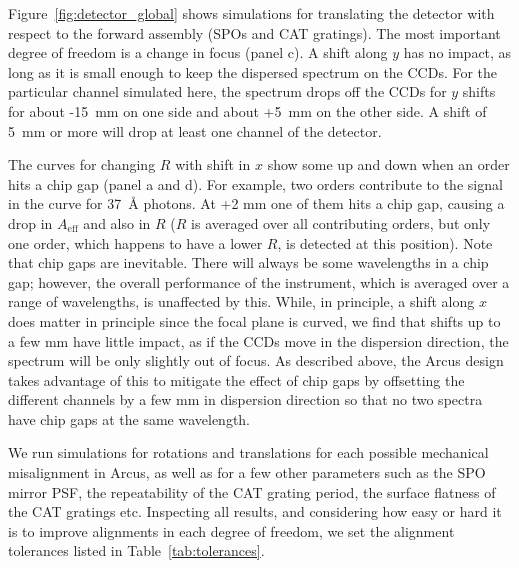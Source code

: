 \documentclass[12pt]{spieman}  %
\begin{document}
\begin{spacing}{2}
Figure~\ref{fig:detector_global} shows simulations for translating the detector with respect to the forward assembly (SPOs and CAT gratings). The most important degree of freedom is a change in focus (panel c). A shift along $y$ has no impact, as long as it is small enough to keep the dispersed spectrum on the CCDs. For the particular channel simulated here, the spectrum drops off the CCDs for $y$ shifts for about -15~mm on one side and about +5~mm on the other side. A shift of 5~mm or more will drop at least one channel of the detector.

The curves for changing $R$ with shift in $x$ show some up and down when an order hits a chip gap (panel a and d). For example, two orders contribute to the signal in the curve for 37~\AA{} photons. At +2 mm one of them hits a chip gap, causing a drop in $A_\mathrm{eff}$ and also in $R$ ($R$ is averaged over all contributing orders, but only one order, which happens to have a lower $R$, is detected at this position). Note that chip gaps are inevitable. There will always be some wavelengths in a chip gap; however, the overall performance of the instrument, which is averaged over a range of wavelengths, is unaffected by this. While, in principle, a shift along $x$ does matter in principle since the focal plane is curved, we find that shifts up to a few mm have little impact, as if the CCDs move in the dispersion direction, the spectrum will be only slightly out of focus. As described above, the Arcus design takes advantage of this to mitigate the effect of chip gaps by offsetting the different channels by a few mm in dispersion direction so that no two spectra have chip gaps at the same wavelength.

We run simulations for rotations and translations for each possible mechanical misalignment in Arcus, as well as for a few other parameters such as the SPO mirror PSF, the repeatability of the CAT grating period, the surface flatness of the CAT gratings etc. Inspecting all results, and considering how easy or hard it is to improve alignments in each degree of freedom, we set the alignment tolerances listed in Table~\ref{tab:tolerances}.


\end{spacing}
\end{document}
